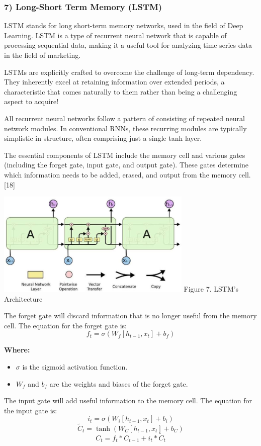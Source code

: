 \documentclass[conference]{IEEEtran}
\begin{document}
{\subsubsection*{\textbf{7) Long-Short Term Memory (LSTM)}}
LSTM stands for long short-term memory networks, used in the field of Deep Learning. LSTM is a type of recurrent neural network that is capable of processing sequential data, making it a useful tool for analyzing time series data in the field of marketing.

LSTMs are explicitly crafted to overcome the challenge of long-term dependency. They inherently excel at retaining information over extended periods, a characteristic that comes naturally to them rather than being a challenging aspect to acquire!

All recurrent neural networks follow a pattern of consisting of repeated neural network modules. In conventional RNNs, these recurring modules are typically simplistic in structure, often comprising just a single tanh layer.

The essential components of LSTM include the memory cell and various gates (including the forget gate, input gate, and output gate). These gates determine which information needs to be added, erased, and output from the memory cell.[18]

\begin{center}
\includegraphics[max width=\linewidth, height = 5cm]{LSTM-architecture.jpg}
Figure 7. LSTM's Architecture
\end{center}

The forget gate will discard information that is no longer useful from the memory cell. The equation for the forget gate is:
\[ f_t = \sigma(W_f [h_{t-1}, x_t] + b_f) \]

\textbf{Where:}
\begin{itemize}
    \item $\sigma$ is the sigmoid activation function.
    \item $W_f$ and $b_f$ are the weights and biases of the forget gate.
\end{itemize} 
The input gate will add useful information to the memory cell. The equation for the input gate is:
\[ i_t = \sigma(W_i [h_{t-1}, x_t] + b_i) \]
\[ \tilde{C}_t = \tanh(W_C [h_{t-1}, x_t] + b_C) \]
\[ C_t = f_t \ast C_{t-1} + i_t \ast \tilde{C}_t \]

}
\end{document}

